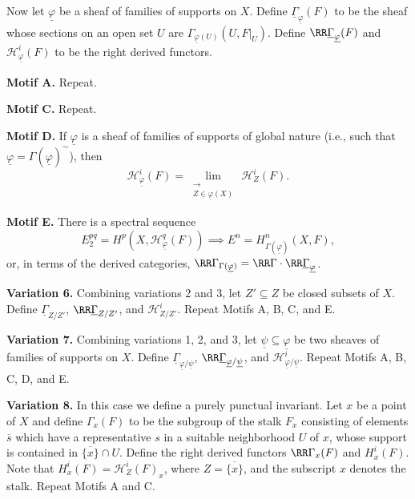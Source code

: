 Now let $\underline{\varphi}$ be a sheaf of families of supports on $X$. Define $\underline{\Gamma}_{\underline{\varphi}}(F)$ to be the sheaf whose sections on an open set $U$ are $\Gamma_{\underline{\varphi}(U)}(U,F|_U)$. Define $\RR\underline{\Gamma}_{\underline{\varphi}}(F)$ and $\mathcal{H}^{i}_{\underline{\varphi}}(F)$ to be the right derived functors.

\medskip\noindent\textbf{Motif A.} Repeat.

\medskip\noindent\textbf{Motif C.} Repeat.

\medskip\noindent\textbf{Motif D.} If $\underline{\varphi}$ is a sheaf of families of supports of global nature (i.e., such that $\underline{\varphi}=\Gamma(\underline{\varphi})^{\sim}$), then
\[
\mathcal{H}_{\underline{\varphi}}^{i}(F)=\lim_{\substack{\longrightarrow \\ Z\in\underline{\varphi}(X)}}\,\mathcal{H}_{Z}^{i}(F).
\]

\medskip\noindent\textbf{Motif E.} There is a spectral sequence
\[
E_2^{pq}=H^p(X, \mathcal{H}_{\underline{\varphi}}^q(F))\implies E^n=H_{\Gamma(\underline{\varphi})}^n(X, F),
\]
or, in terms of the derived categories, $\RR\Gamma_{\Gamma(\underline{\varphi})} = \RR\Gamma\cdot \RR\underline{\Gamma}_{\underline{\varphi}}$.

\medskip\noindent\textbf{Variation 6.}
Combining variations 2 and 3, let $Z'\subseteq Z$ be closed subsets of $X$. Define $\underline{\Gamma}_{Z/Z'}$, $\RR\underline{\Gamma}_{Z/Z'}$, and $\mathcal{H}^i_{Z/Z'}$. Repeat Motifs A, B, C, and E.

\medskip\noindent\textbf{Variation 7.}
Combining variations 1, 2, and 3, let $\underline{\psi}\subseteq\underline{\varphi}$ be two sheaves of families of supports on $X$. Define $\underline{\Gamma}_{\underline{\varphi}/\underline{\psi}}$, $\RR\underline{\Gamma}_{\underline{\varphi}/\underline{\psi}}$, and $\mathcal{H}_{\underline{\varphi}/\underline{\psi}}^{i}$. Repeat Motifs A, B, C, D, and E.

\medskip\noindent\textbf{Variation 8.}
In this case we define a purely punctual invariant. Let $x$ be a point of $X$ and define $\Gamma_x(F)$ to be the subgroup of the stalk $F_x$ consisting of elements $\overline{s}$ which have a representative $s$ in a suitable neighborhood $U$ of $x$, whose support is contained in $\overline{\{x\}}\cap U$. Define the right derived functors $\RR\Gamma_x(F)$ and $H_x^{i}(F)$. Note that $H_x^{i}(F)=\mathcal{H}_Z^{i}(F)_x$, where $Z=\overline{\{x\}}$, and the subscript $x$ denotes the stalk. Repeat Motifs A and C.


